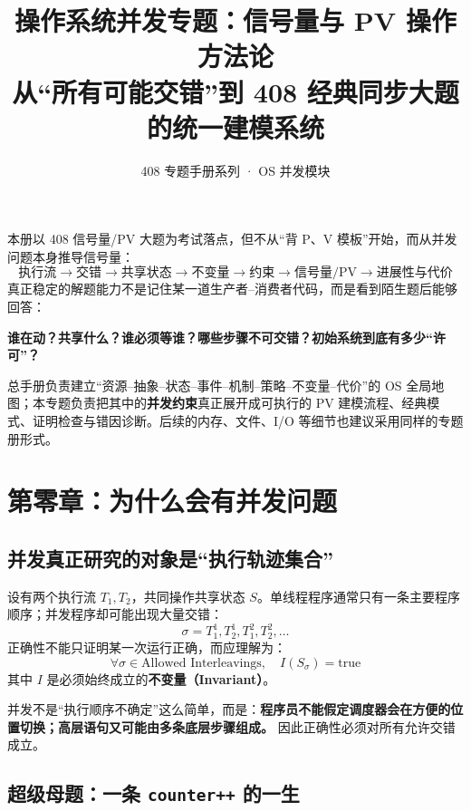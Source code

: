 \documentclass[11pt,a4paper]{ctexart}
\title{\vspace{-1.2cm}\textbf{操作系统并发专题：信号量与 PV 操作方法论}\\[0.45em]
\large 从“所有可能交错”到 408 经典同步大题的统一建模系统}
\author{408 专题手册系列 · OS 并发模块}
\date{}
\newcommand{\kw}[1]{\textbf{#1}}
\newcommand{\code}[1]{\texttt{#1}}
\begin{document}
\maketitle

\begin{corebox}
本册以 408 信号量/PV 大题为考试落点，但不从“背 P、V 模板”开始，而从并发问题本身推导信号量：
\[
\boxed{
\text{执行流}
\to\text{交错}
\to\text{共享状态}
\to\text{不变量}
\to\text{约束}
\to\text{信号量/PV}
\to\text{进展性与代价}
}
\]
真正稳定的解题能力不是记住某一道生产者--消费者代码，而是看到陌生题后能够回答：
\begin{center}
\bfseries 谁在动？共享什么？谁必须等谁？哪些步骤不可交错？初始系统到底有多少“许可”？
\end{center}
\end{corebox}

\begin{method}[专题手册与总手册的关系]
总手册负责建立“资源--抽象--状态--事件--机制--策略--不变量--代价”的 OS 全局地图；本专题负责把其中的\kw{并发约束}真正展开成可执行的 PV 建模流程、经典模式、证明检查与错因诊断。后续的内存、文件、I/O 等细节也建议采用同样的专题册形式。
\end{method}

\tableofcontents
\newpage

\section{第零章：为什么会有并发问题}

\subsection{并发真正研究的对象是“执行轨迹集合”}

设有两个执行流 $T_1,T_2$，共同操作共享状态 $S$。单线程程序通常只有一条主要程序顺序；并发程序却可能出现大量交错：
\[
\sigma=T_1^1,T_2^1,T_1^2,T_2^2,\ldots
\]
正确性不能只证明某一次运行正确，而应理解为：
\[
\boxed{\forall\sigma\in\text{Allowed Interleavings},\quad I(S_\sigma)=\mathrm{true}}
\]
其中 $I$ 是必须始终成立的\kw{不变量（Invariant）}。

\begin{corebox}[并发篇第一原则]
并发不是“执行顺序不确定”这么简单，而是：\kw{程序员不能假定调度器会在方便的位置切换；高层语句又可能由多条底层步骤组成。} 因此正确性必须对所有允许交错成立。
\end{corebox}

\subsection{超级母题：一条 \code{counter++} 的一生}
\end{document}
